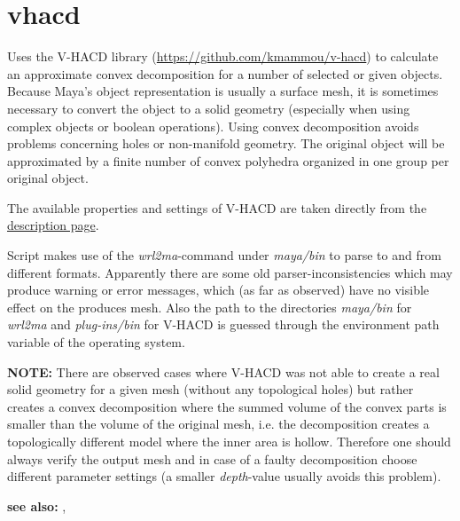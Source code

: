 \documentclass[letterpaper,10pt,english]{sphinxmanual}
\begin{document}
\section{vhacd}
\label{pk_src.vhacd:vhacd}\label{pk_src.vhacd::doc}\label{pk_src.vhacd:id1}
{\hyperref[index:commands]{}}
\label{pk_src.vhacd:module-pk_src.vhacd}
Uses the V-HACD library (\url{https://github.com/kmammou/v-hacd}) to calculate an approximate convex decomposition for a number of selected or given objects. Because Maya's object representation is usually a surface mesh, it is sometimes necessary to convert the object to a solid geometry (especially when using complex objects or boolean operations). Using convex decomposition avoids problems concerning holes or non-manifold geometry. The original object will be approximated by a finite number of convex polyhedra organized in one group per original object.

The available properties and settings of V-HACD are taken directly from the \href{http://kmamou.blogspot.de/2014/12/v-hacd-20-parameters-description.html}{description page}.

Script makes use of the \emph{wrl2ma}-command under \emph{maya/bin} to parse to and from different formats. Apparently there are some old parser-inconsistencies which may produce warning or error messages, which (as far as observed) have no visible effect on the produces mesh. Also the path to the directories \emph{maya/bin} for \emph{wrl2ma} and \emph{plug-ins/bin} for V-HACD is guessed through the environment path variable of the operating system.

\textbf{NOTE:} There are observed cases where V-HACD was not able to create a real solid geometry for a given mesh (without any topological holes) but rather creates a convex decomposition where the summed volume of the convex parts is smaller than the volume of the original mesh, i.e. the decomposition creates a topologically different model where the inner area is hollow. Therefore one should always verify the output mesh and in case of a faulty decomposition choose different parameter settings (a smaller \emph{depth}-value usually avoids this problem).

\textbf{see also:} {\hyperref[pk_src.getVolume:getvolume]{}}, {\hyperref[pk_src.intersection:intersection]{}}
\end{document}
